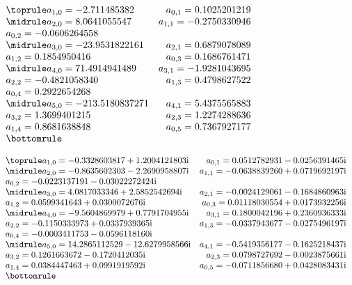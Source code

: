 \documentclass[pdftex]{sigma}
\numberwithin{equation}{section}
\begin{document}
\begin{table}[ht!]\centering
\caption[]{$\alpha^{-1}=1/3$, $\rho_{\rm F}=1.29101$.}\label{table2}
$\begin{array}{lr}
\toprule
a_{1,0}=-2.711485382 & a_{0,1}=0.1025201219 \\
\midrule
a_{2,0}=8.0641055547 & a_{1,1}=-0.2750330946 \\
a_{0,2}=-0.0606264558 & \\
\midrule
a_{3,0}=-23.9531822161 & a_{2,1}= 0.6879078089 \\
a_{1,2}=0.1854950416& a_{0,3}=0.1686761471\\
\midrule
a_{4,0}=71.4914941489&a_{3,1}=-1.9281043695 \\
a_{2,2}=-0.4821058340&a_{1,3}=0.4798627522\\
a_{0,4}=0.2922654268&\\
\midrule
a_{5,0}=-213.5180837271 & a_{4,1}=5.4375565883\\
a_{3,2}=1.3699401215& a_{2,3}=1.2274288636\\
a_{1,4}=0.8681638848& a_{0,5}=0.7367927177\\
\bottomrule
\end{array}$\vspace{-4mm}
\end{table}
\begin{table}[ht!]\centering
\caption[]{$\alpha^{-1}=\frac{4+3{\rm i}}{10}$, $\rho_{\rm F}=0.86175-0.38528 {\rm i}$}\label{table3}
$\begin{array}{lr}
\toprule
a_{1,0}=-0.3328603817+1.2004121803{\rm i} & a_{0,1}=0.0512782931-0.0256391465{\rm i} \\
\midrule
a_{2,0}=-0.8635602303-2.2690958807{\rm i}& a_{1,1}=-0.0638839260+0.0719692197{\rm i}\\
a_{0,2}=-0.0223137191-0.03022272424{\rm i}\\
\midrule
a_{3,0}=4.0817033346+2.5852542694{\rm i} & a_{2,1}=-0.0024129061-0.1684860963{\rm i}\\
a_{1,2}=0.0599341643+0.0300072676{\rm i}& a_{0,3}=0.01118030554+0.0173932256{\rm i}\\
\midrule
a_{4,0}=-9.5604869979+0.7791704955{\rm i}&a_{3,1}=0.1800042196+0.2360936333{\rm i}\\
a_{2,2}=-0.1150333973+0.0337939365{\rm i}&a_{1,3}=-0.0337943677-0.0275496197{\rm i}\\
a_{0,4}=-0.0003411753-0.0596118160{\rm i}\\
\midrule
a_{5,0}=14.2865112529-12.6279958566{\rm i}& a_{4,1}=-0.5419356177-0.1625218437{\rm i}\\
a_{3,2}=0.1261663672-0.1720412035{\rm i}& a_{2,3}=0.0798727692-0.0023875661{\rm i}\\
a_{1,4}=0.0384447463+0.0991919592{\rm i}& a_{0,5}=-0.0711856680+0.0428083431{\rm i}\\
\bottomrule
\end{array}$\vspace{-4mm}
\end{table}
\end{document}
